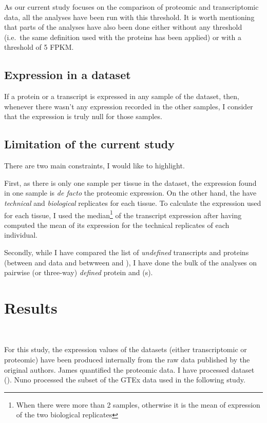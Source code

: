 As our current study focuses on the comparison of proteomic and transcriptomic
data, all the analyses have been run with this threshold. It is worth mentioning
that parts of the analyses have also been done either without
any threshold (i.e.\ the same definition used with the proteins has been applied)
or with a threshold of 5 \gls{FPKM}.

\subsection{Expression in a dataset}

If a protein or a transcript is expressed in any sample of the dataset, then,
whenever there wasn't any expression recorded in the other samples, I consider
that the expression is truly null for those samples.

\subsection{Limitation of the current study}

There are two main constraints, I would like to highlight.

First, as there is only one sample per tissue in the 
dataset, the expression found in one sample is \textit{de facto} the proteomic
expression. On the other hand, the  have \emph{technical} and
\emph{biological} replicates for each tissue. To calculate the expression used for
each tissue, I used the median\footnote{When there were more than 2 samples,
otherwise it is the mean of expression of the two biological replicates}
of the transcript expression after having computed the mean of its expression
for the technical replicates of each individual.


Secondly, while I have compared the list of \emph{undefined} transcripts and proteins
(between  and  data and betwween
 and ), I have done the bulk of the analyses
on pairwise (or three-way) \emph{defined} protein and \mRNA(s).

\section{Results}\raggedbottom\
\label{sec:IntegrationResults}

For this study, the expression values of the datasets (either transcriptomic or
proteomic) have been produced internally from the raw data published by the
original authors. James quantified the proteomic data.  I have processed
\dataset{Uhlén \etal} dataset (\Rnaseq). Nuno processed the subset
of the GTEx data used in the following study.

